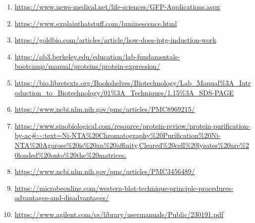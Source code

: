 \documentclass[twoside]{article}
\begin{document}
\begin{multicols}{2}
\begin{enumerate}
    \item \url{https://www.news-medical.net/life-sciences/GFP-Applications.aspx}
    \item \url{https://www.explainthatstuff.com/luminescence.html}
    \item \url{https://goldbio.com/articles/article/how-does-iptg-induction-work}
    \item \url{https://qb3.berkeley.edu/education/lab-fundamentals-bootcamp/manual/proteins/protein-expression/}
    \item \url{https://bio.libretexts.org/Bookshelves/Biotechnology/Lab_Manual%3A_Introduction_to_Biotechnology/01%3A_Techniques/1.15%3A_SDS-PAGE}
    \item \url{https://www.ncbi.nlm.nih.gov/pmc/articles/PMC8969215/}
    \item \url{https://www.sinobiological.com/resource/protein-review/protein-purification-by-ac#:~:text=Ni-NTA%20Chromatography%20Purification%20Ni-NTA%20Agarose%20is%20an%20affinity,Cleared%20cell%20lysates%20are%20loaded%20onto%20the%20matrices.}
    \item \url{https://www.ncbi.nlm.nih.gov/pmc/articles/PMC3456489/}
    \item \url{https://microbeonline.com/western-blot-technique-principle-procedures-advantages-and-disadvantages/}
    \item \url{https://www.agilent.com/cs/library/usermanuals/Public/230191.pdf}
\end{enumerate}



\end{multicols}
\end{document}
